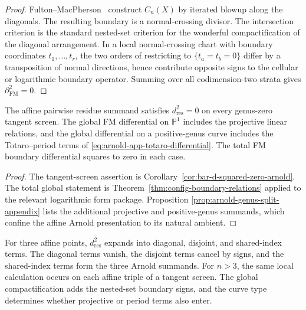 \begin{proof}
Fulton--MacPherson~\cite{FM94} construct \(\overline{C}_n(X)\) by
iterated blowup along the diagonals. The resulting boundary is a
normal-crossing divisor. The intersection criterion is the standard
nested-set criterion for the wonderful compactification of the
diagonal arrangement. In a local normal-crossing chart with boundary
coordinates \(t_1,\ldots,t_r\), the two orders of restricting to
\(\{t_a=t_b=0\}\) differ by a transposition of normal directions, hence
contribute opposite signs to the cellular or logarithmic boundary
operator. Summing over all codimension-two strata gives
\(\partial_{\mathrm{FM}}^2=0\).
\end{proof}

\begin{corollary}\label{cor:dres-squared-global}
The affine pairwise residue summand satisfies \(d_{\mathrm{res}}^2=0\)
on every genus-zero tangent screen. The global FM differential on
\(\mathbb{P}^1\) includes the projective linear relations, and the
global differential on a positive-genus curve includes the
Totaro--period terms of
\eqref{eq:arnold-app-totaro-differential}. The total FM boundary
differential squares to zero in each case.
\end{corollary}

\begin{proof}
The tangent-screen assertion is
Corollary~\ref{cor:bar-d-squared-zero-arnold}. The total global
statement is Theorem~\ref{thm:config-boundary-relations} applied to
the relevant logarithmic form package. Proposition
\ref{prop:arnold-genus-split-appendix} lists the additional projective
and positive-genus summands, which confine the affine Arnold
presentation to its natural ambient.
\end{proof}

\begin{remark}\label{rem:nine-term-global}
For three affine points, \(d_{\mathrm{res}}^2\) expands into diagonal,
disjoint, and shared-index terms. The diagonal terms vanish, the
disjoint terms cancel by signs, and the shared-index terms form the
three Arnold summands. For \(n>3\), the same local calculation occurs
on each affine triple of a tangent screen. The global compactification
adds the nested-set boundary signs, and the curve type determines
whether projective or period terms also enter.
\end{remark}
